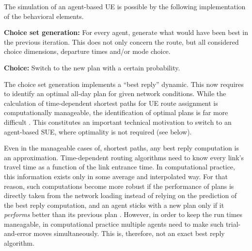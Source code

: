 The simulation of an agent-based UE is possible by the following 
implementation of the behavioral elements.

%
%
%
%

\textbf{Choice set generation:} For every agent,
  generate what would have been best in the previous iteration.
  This does not only concern the route,
  but all considered choice dimensions, \eg departure times and/or
  mode choice. 

\textbf{Choice:} Switch to the new plan with a
  certain probability.

The choice set generation implements a ``best reply'' dynamic. 
This now requires to identify an optimal all-day plan for given network conditions. 
While the calculation of time-dependent shortest paths for UE route assignment is 
computationally manageable, the identification of optimal plans is far more difficult 
\citep[][]{recker-2001}. 
This constitutes an important technical motivation to switch to an agent-based SUE, 
where optimality is not required (see below).

Even in the manageable cases of, \eg shortest paths, 
any best reply computation is an approximation.  
Time-dependent routing algorithms need to know every link's travel
time as a function of the link entrance time.  In computational
practice, this information exists only in some average and
interpolated way.  For that reason, such computations become more
robust if the performance of plans is directly taken from the network
loading instead of relying on the prediction of the best reply
computation, and an agent sticks with a new plan only if it
\emph{performs} better than its previous plan
\citep{RaneyNagel2004agdb}.  However, in order to keep the run times
maneagable, in computational practice multiple agents need to make
such trial-and-error moves simultaneously.  This is, therefore, not an
exact best reply algorithm.

